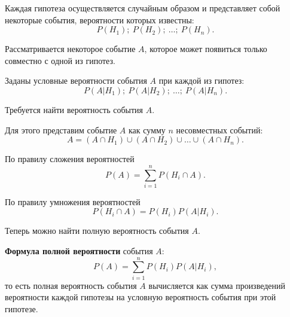 \documentclass[a4paper]{article}
\newcommand{\key}[1]{{\color{Medium}\bfseries #1}}
\begin{document}
                Каждая гипотеза осуществляется случайным образом и представляет собой некоторые события, вероятности которых известны:
                \begin{equation*}
                    P(H_1) ; \: P(H_2) ; \: \ldots ; \: P(H_n) .
                \end{equation*}

                Рассматривается некоторое событие $A$, которое может появиться только совместно с одной из гипотез.
                
                Заданы условные вероятности события $A$ при каждой из гипотез:
                \begin{equation*}
                    P(A | H_1) ; \: P(A | H_2) ; \: \ldots ; \: P(A | H_n) .
                \end{equation*}

                Требуется найти вероятность события $A$.
                
                Для этого представим событие $A$ как сумму $n$ несовместных событий:
                \begin{equation*}
                    A = (A \cap H_1) \cup (A \cap H_2) \cup \ldots \cup (A \cap H_n) .
                \end{equation*}

                По правилу сложения вероятностей
                \begin{equation*}
                    P(A) = \sum\limits_{i = 1}^{n} P(H_i \cap A) .
                \end{equation*}

                По правилу умножения вероятностей
                \begin{equation*}
                    P(H_i \cap A) = P(H_i) P(A | H_i) .
                \end{equation*}

                Теперь можно найти полную вероятность события $A$.

                \key{Формула полной вероятности} события $A$:
                \begin{equation*}
                    P(A) = \sum\limits_{i = 1}^{n} P(H_i) P(A | H_i) ,
                \end{equation*}
                то есть полная вероятность события $A$ вычисляется как сумма произведений вероятности каждой гипотезы на условную вероятность события при этой гипотезе.
\end{document}
